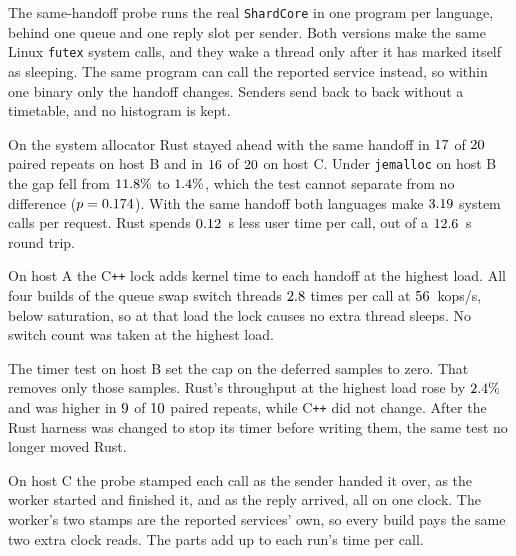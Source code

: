 \documentclass[english,oneside,a4paper,censored,csm,software-track-2020]{HYthesisML}
\begin{document}
\begin{appendices}
The same-handoff probe runs the real \texttt{ShardCore} in one program per
language, behind one queue and one reply slot per sender. Both versions make
the same Linux \texttt{futex} system calls, and they wake a thread only after
it has marked itself as sleeping. The same program can call the reported
service instead, so within one binary only the handoff changes. Senders send
back to back without a timetable, and no histogram is kept.

On the system allocator Rust stayed ahead with the same handoff in
$17$ of $20$ paired repeats on host B and in
$16$ of $20$ on host C. Under
\texttt{jemalloc} on host B the gap fell from $11.8\%$
to $1.4\%$, which the test cannot separate from no
difference ($p = 0.174$). With the same handoff both
languages make $3.19$ system calls per request. Rust spends
$0.12$~\textmu s less user time per call, out of a
$12.6$~\textmu s round trip.

On host A the C\texttt{++} lock adds kernel time to each handoff at the highest load. All
four builds of the queue swap switch threads $2.8$ times per call at
$56$~kops/s, below saturation, so at that load the lock causes no extra thread
sleeps. No switch count was taken at the highest load.

The timer test on host B set the cap on the deferred samples to zero. That
removes only those samples. Rust's throughput at the highest
load rose by $2.4\%$ and was higher in $9$
of $10$ paired repeats, while C\texttt{++} did not change. After
the Rust harness was changed to stop its timer before writing them, the same
test no longer moved Rust.

On host C the probe stamped each call as the sender handed it over, as the
worker started and finished it, and as the reply arrived, all on one clock.
The worker's two stamps are the reported services' own, so every build pays
the same two extra clock reads. The parts add up to each run's time per
call.

\end{appendices}

\clearpage
\end{document}
